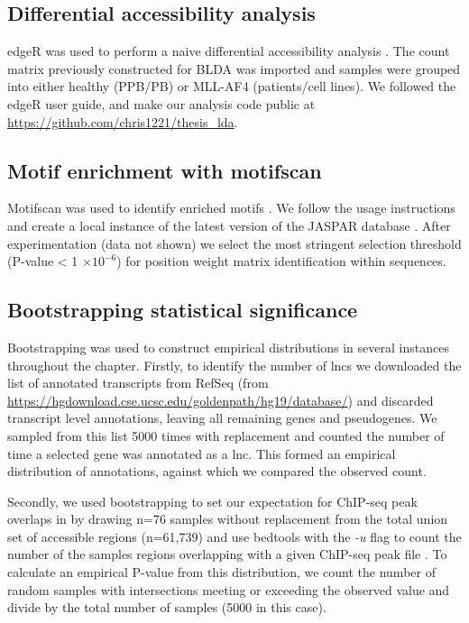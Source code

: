 \subsection{Differential accessibility analysis}

edgeR was used to perform a naive differential accessibility analysis \cite{Robinson2009}. The count matrix previously constructed for BLDA was imported and samples were grouped into either healthy (PPB/PB) or MLL-AF4 (patients/cell lines). We followed the edgeR user guide, and make our analysis code public at \url{https://github.com/chris1221/thesis_lda}. 


\subsection{Motif enrichment with motifscan}

Motifscan was used to identify enriched motifs \cite{Sun2018}. We follow the usage instructions and create a local instance of the latest version of the JASPAR database \cite{Fornes2020}. After experimentation (data not shown) we select the most stringent selection threshold (P-value < 1 $\times 10^{-6}$) for position weight matrix identification within sequences. 

\subsection{Bootstrapping statistical significance}

Bootstrapping was used to construct empirical distributions in several instances throughout the chapter. Firstly, to identify the number of \glspl{lnc} we downloaded the list of annotated transcripts from RefSeq (from \url{https://hgdownload.cse.ucsc.edu/goldenpath/hg19/database/}) and discarded transcript level annotations, leaving all remaining genes and pseudogenes. We sampled from this list 5000 times with replacement and counted the number of time a selected gene was annotated as a \gls{lnc}. This formed an empirical distribution of annotations, against which we compared the observed count.  

Secondly, we used bootstrapping to set our expectation for ChIP-seq peak overlaps in  by drawing n=76 samples without replacement from the total union set of accessible regions (n=61,739) and use bedtools with the \textit{-u} flag to count the number of the samples regions overlapping with a given ChIP-seq peak file \cite{Quinlan2010}. To calculate an empirical P-value from this distribution, we count the number of random samples with intersections meeting or exceeding the observed value and divide by the total number of samples (5000 in this case).

